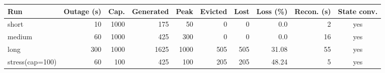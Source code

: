 \begin{tabular}{lrrrrrrrrc}
\toprule
Run & Outage (s) & Cap. & Generated & Peak & Evicted & Lost & Loss (\%) & Recon. (s) & State conv.\\
\midrule
short & 10 & 1000 & 175 & 50 & 0 & 0 & 0.0 & 2 & yes\\
medium & 60 & 1000 & 425 & 300 & 0 & 0 & 0.0 & 16 & yes\\
long & 300 & 1000 & 1625 & 1000 & 505 & 505 & 31.08 & 55 & yes\\
stress(cap=100) & 60 & 100 & 425 & 100 & 205 & 205 & 48.24 & 5 & yes\\
\bottomrule
\end{tabular}